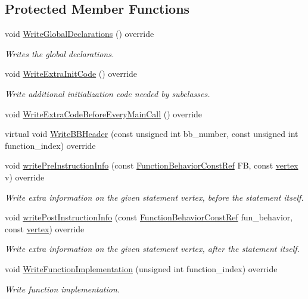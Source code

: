 \subsection*{Protected Member Functions}
\begin{DoxyCompactItemize}
\item 
void \hyperlink{classDiscrepancyAnalysisCWriter_a33b017d849ad5c03561e0bd2a72a37a9}{Write\+Global\+Declarations} () override
\begin{DoxyCompactList}\small\item\em Writes the global declarations. \end{DoxyCompactList}\item 
void \hyperlink{classDiscrepancyAnalysisCWriter_a4372f752e67aea0e47542ee355932da2}{Write\+Extra\+Init\+Code} () override
\begin{DoxyCompactList}\small\item\em Write additional initialization code needed by subclasses. \end{DoxyCompactList}\item 
void \hyperlink{classDiscrepancyAnalysisCWriter_a174c35dd3c04952215d5a5f9aa0df0c9}{Write\+Extra\+Code\+Before\+Every\+Main\+Call} () override
\item 
virtual void \hyperlink{classDiscrepancyAnalysisCWriter_aa06e1b8c2dedbdb1278f61c7970ebc62}{Write\+B\+B\+Header} (const unsigned int bb\+\_\+number, const unsigned int function\+\_\+index) override
\item 
void \hyperlink{classDiscrepancyAnalysisCWriter_a891686ef683dad2ed3b99d071f3fb69a}{write\+Pre\+Instruction\+Info} (const \hyperlink{function__behavior_8hpp_a94872da12ed056b6ecf90456164e0213}{Function\+Behavior\+Const\+Ref} FB, const \hyperlink{graph_8hpp_abefdcf0544e601805af44eca032cca14}{vertex} v) override
\begin{DoxyCompactList}\small\item\em Write extra information on the given statement vertex, before the statement itself. \end{DoxyCompactList}\item 
void \hyperlink{classDiscrepancyAnalysisCWriter_aab973340021c0338599762a89589a588}{write\+Post\+Instruction\+Info} (const \hyperlink{function__behavior_8hpp_a94872da12ed056b6ecf90456164e0213}{Function\+Behavior\+Const\+Ref} fun\+\_\+behavior, const \hyperlink{graph_8hpp_abefdcf0544e601805af44eca032cca14}{vertex}) override
\begin{DoxyCompactList}\small\item\em Write extra information on the given statement vertex, after the statement itself. \end{DoxyCompactList}\item 
void \hyperlink{classDiscrepancyAnalysisCWriter_a544a8f99622f86cfbcc2eae9a83d4e64}{Write\+Function\+Implementation} (unsigned int function\+\_\+index) override
\begin{DoxyCompactList}\small\item\em Write function implementation. \end{DoxyCompactList}\end{DoxyCompactItemize}
